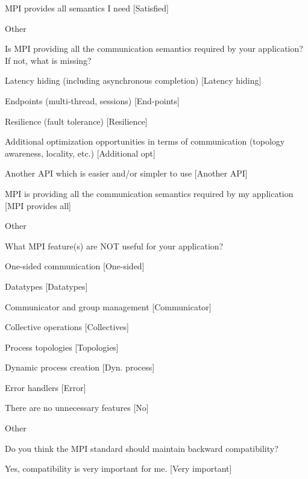 \documentclass[preprint,5p,times]{elsarticle}
\begin{document}
{{\begin{description}
\begin{inparaenum}[{\bf C}1)]
    \item MPI provides all semantics I need [Satisfied]
    \item Other
    \end{inparaenum}
  \item[Q26*:] Is MPI providing all the communication semantics required
    by your application? If not, what is missing?
    \begin{inparaenum}[{\bf C}1)]
    \item Latency hiding (including asynchronous completion) [Latency hiding]
    \item Endpoints (multi-thread, sessions) [End-points]
    \item Resilience (fault tolerance) [Resilience]
    \item Additional optimization opportunities in terms of communication
      (topology awareness, locality, etc.) [Additional opt]
    \item Another API which is easier and/or simpler to use [Another API]
    \item MPI is providing all the communication semantics required by my
      application [MPI provides all]
    \item Other
    \end{inparaenum}
  \item[Q27*:] What MPI feature(s) are NOT useful for your application?
    \begin{inparaenum}[{\bf C}1)]
    \item One-sided communication [One-sided]
    \item Datatypes [Datatypes]
    \item Communicator and group management [Communicator]
    \item Collective operations [Collectives]
    \item Process topologies [Topologies]
    \item Dynamic process creation [Dyn. process]
    \item Error handlers [Error]
    \item There are no unnecessary features [No]
    \item Other
    \end{inparaenum}
  \item[Q28:] Do you think the MPI standard should maintain backward
    compatibility?
    \begin{inparaenum}[{\bf C}1)]
    \item Yes, compatibility is very important for me. [Very important]

\end{inparaenum}
\end{description}}}
\end{document}

